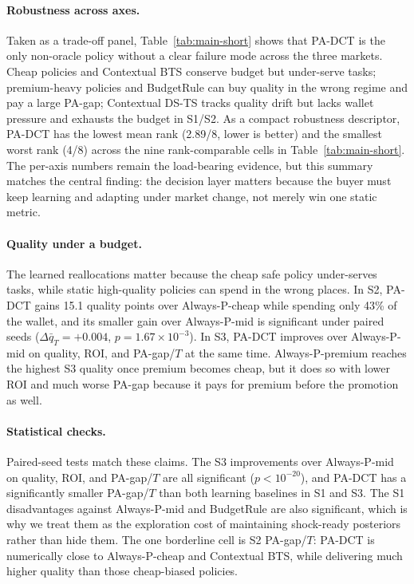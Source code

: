 \documentclass[sigconf, nonacm]{acmart}
\DeclareRobustCommand{\padct}{PA\nobreakdash-DCT}
\begin{document}
\paragraph{Robustness across axes.}
Taken as a trade-off panel, Table~\ref{tab:main-short} shows that \padct{} is the only non-oracle policy without a clear failure mode across the three markets. Cheap policies and Contextual BTS conserve budget but under-serve tasks; premium-heavy policies and BudgetRule can buy quality in the wrong regime and pay a large PA-gap; Contextual DS-TS tracks quality drift but lacks wallet pressure and exhausts the budget in S1/S2. As a compact robustness descriptor, \padct{} has the lowest mean rank (2.89/8, lower is better) and the smallest worst rank (4/8) across the nine rank-comparable cells in Table~\ref{tab:main-short}. The per-axis numbers remain the load-bearing evidence, but this summary matches the central finding: the decision layer matters because the buyer must keep learning and adapting under market change, not merely win one static metric.

\paragraph{Quality under a budget.}
The learned reallocations matter because the cheap safe policy under-serves tasks, while static high-quality policies can spend in the wrong places. In S2, \padct{} gains 15.1 quality points over Always-P-cheap while spending only 43\% of the wallet, and its smaller gain over Always-P-mid is significant under paired seeds ($\Delta\bar q_T=+0.004$, $p=1.67\times10^{-3}$). In S3, \padct{} improves over Always-P-mid on quality, ROI, and PA-gap/$T$ at the same time. Always-P-premium reaches the highest S3 quality once premium becomes cheap, but it does so with lower ROI and much worse PA-gap because it pays for premium before the promotion as well.

\paragraph{Statistical checks.}
Paired-seed tests match these claims. The S3 improvements over Always-P-mid on quality, ROI, and PA-gap/$T$ are all significant ($p<10^{-20}$), and \padct{} has a significantly smaller PA-gap/$T$ than both learning baselines in S1 and S3. The S1 disadvantages against Always-P-mid and BudgetRule are also significant, which is why we treat them as the exploration cost of maintaining shock-ready posteriors rather than hide them. The one borderline cell is S2 PA-gap/$T$: \padct{} is numerically close to Always-P-cheap and Contextual BTS, while delivering much higher quality than those cheap-biased policies.
\end{document}
